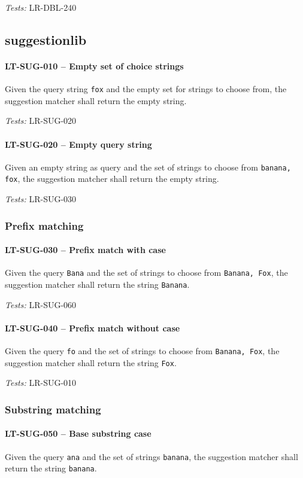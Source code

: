 \textit{Tests: } LR-DBL-240

\subsection{suggestion\textunderscore lib}
\paragraph{LT-SUG-010 -- Empty set of choice strings}
Given the query string \lstinline{fox} and the empty set for strings
to choose from, the suggestion matcher shall return the empty string.

\textit{Tests: } LR-SUG-020

\paragraph{LT-SUG-020 -- Empty query string}
Given an empty string as query and the set of strings to choose
from \lstinline{banana, fox}, the suggestion matcher shall
return the empty string.

\textit{Tests: } LR-SUG-030

\subsubsection{Prefix matching}
\paragraph{LT-SUG-030 -- Prefix match with case}
Given the query \lstinline{Bana} and the set of strings to choose
from \lstinline{Banana, Fox}, the suggestion matcher shall
return the string \lstinline{Banana}.

\textit{Tests: } LR-SUG-060

\paragraph{LT-SUG-040 -- Prefix match without case}
Given the query \lstinline{fo} and the set of strings to choose from
\lstinline{Banana, Fox}, the suggestion matcher shall return
the string \lstinline{Fox}.

\textit{Tests: } LR-SUG-010

\subsubsection{Substring matching}
\paragraph{LT-SUG-050 -- Base substring case}
Given the query \lstinline{ana} and the set of strings
\lstinline{banana}, the suggestion matcher shall return the
string \lstinline{banana}.

